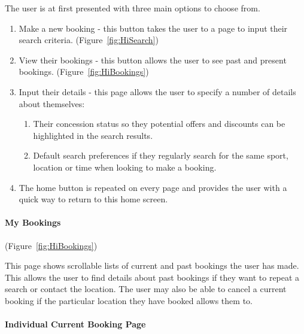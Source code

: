 The user is at first presented with three main options to choose from.
\begin{enumerate}
	\item Make a new booking - this button takes the user to a page to input
	      their search criteria. (Figure~\ref{fig:HiSearch})
	\item View their bookings - this button allows the user to see past and
	      present bookings. (Figure~\ref{fig:HiBookings})
	\item Input their details - this page allows the user to specify a number
	      of details about themselves:
	      
	      \begin{enumerate}
	      	\item Their concession status so they potential offers and discounts can
	      	      be highlighted in the search results.
	      	\item Default search preferences if they regularly search for the same sport,
	      	      location or time when looking to make a booking.
	      \end{enumerate}
	\item The home button is repeated on every page and provides the user with
	      a quick way to return to this home screen.
\end{enumerate}

\paragraph{My Bookings}

(Figure~\ref{fig:HiBookings})


This page shows scrollable lists of current and past bookings the
user has made. This allows the user to find details about past bookings
if they want to repeat a search or contact the location. The user
may also be able to cancel a current booking if the particular location
they have booked allows them to.


\paragraph{Individual Current Booking Page}


